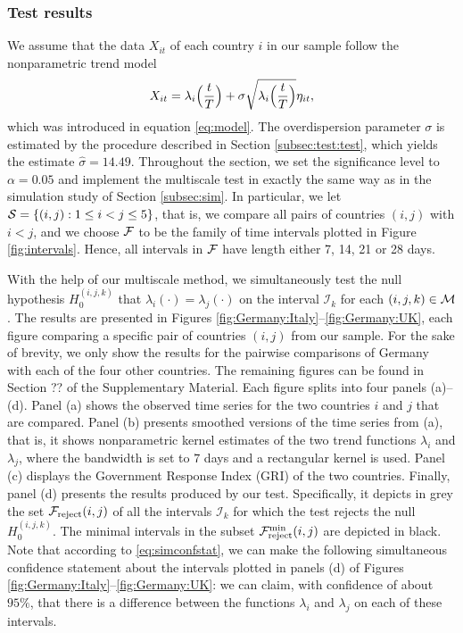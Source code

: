 \documentclass[a4paper,12pt]{article}
\numberwithin{equation}{section}
\begin{document}
\subsubsection{Test results}


We assume that the data $X_{it}$ of each country $i$ in our sample follow the nonparametric trend model 
\[ X_{it} = \lambda_i\Big(\frac{t}{T}\Big) + \sigma \sqrt{\lambda_i\Big(\frac{t}{T}\Big)} \eta_{it}, \]
which was introduced in equation \eqref{eq:model}. The overdispersion parameter $\sigma$ is estimated by the procedure described in Section \ref{subsec:test:test}, which yields the estimate $\widehat{\sigma} = 14.49$. Throughout the section, we set the significance level to $\alpha=0.05$ and implement the multiscale test in exactly the same way as in the simulation study of Section \ref{subsec:sim}. In particular, we let $\mathcal{S} = \{ (i,j): 1 \le i < j \le 5\}$, that is, we compare all pairs of countries $(i,j)$ with $i < j$, and we choose $\mathcal{F}$ to be the family of time intervals plotted in Figure \ref{fig:intervals}. Hence, all intervals in $\mathcal{F}$ have length either 7, 14, 21 or 28 days. 


With the help of our multiscale method, we simultaneously test the null hypothesis $H_0^{(i, j, k)}$ that $\lambda_i(\cdot) = \lambda_j(\cdot)$ on the interval $\mathcal{I}_k$ for each $(i, j, k) \in \mathcal{M}$. The results are presented in Figures \ref{fig:Germany:Italy}--\ref{fig:Germany:UK}, each figure comparing a specific pair of countries $(i,j)$ from our sample. For the sake of brevity, we only show the results for the pairwise comparisons of Germany with each of the four other countries. The remaining figures can be found in Section ?? of the Supplementary Material. Each figure splits into four panels (a)--(d).  Panel (a) shows the observed time series for the two countries $i$ and $j$ that are compared. Panel (b) presents smoothed versions of the time series from (a), that is, it shows nonparametric kernel estimates of the two trend functions $\lambda_i$ and $\lambda_j$, where the bandwidth is set to $7$ days and a rectangular kernel is used. Panel (c) displays the Government Response Index (GRI) of the two countries. Finally, panel (d) presents the results produced by our test. Specifically, it depicts in grey the set $\mathcal{F}_{\text{reject}}(i,j)$ of all the intervals $\mathcal{I}_k$ for which the test rejects the null $H_0^{(i, j, k)}$. The minimal intervals in the subset $\mathcal{F}_{\text{reject}}^{\text{min}}(i, j)$ are depicted in black. Note that according to \eqref{eq:simconfstat}, we can make the following simultaneous confidence statement about the intervals plotted in panels (d) of Figures \ref{fig:Germany:Italy}--\ref{fig:Germany:UK}: we can claim, with confidence of about $95\%$, that there is a difference between the functions $\lambda_i$ and $\lambda_j$ on each of these intervals.
\end{document}
